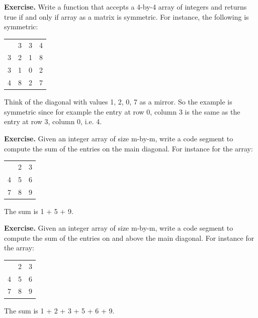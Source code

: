 \textbf{Exercise.} Write a function that accepts a 4-by-4 array of
integers and returns true if and only if array as a matrix is symmetric.
For instance, the following is symmetric:

\begin{longtable}[]{@{}llll@{}}
\toprule\noalign{}
& & & \\
\midrule\noalign{}
\endhead
\bottomrule\noalign{}
\endlastfoot
1 & 3 & 3 & 4 \\
3 & 2 & 1 & 8 \\
3 & 1 & 0 & 2 \\
4 & 8 & 2 & 7 \\
\end{longtable}

Think of the diagonal with values 1, 2, 0, 7 as a mirror. So the example
is symmetric since for example the entry at row 0, column 3 is the same
as the entry at row 3, column 0, i.e. 4.

\textbf{Exercise.} Given an integer array of size m-by-m, write a code
segment to compute the sum of the entries on the main diagonal. For
instance for the array:

\begin{longtable}[]{@{}lll@{}}
\toprule\noalign{}
& & \\
\midrule\noalign{}
\endhead
\bottomrule\noalign{}
\endlastfoot
1 & 2 & 3 \\
4 & 5 & 6 \\
7 & 8 & 9 \\
\end{longtable}

The sum is 1 + 5 + 9.

\textbf{Exercise.} Given an integer array of size m-by-m, write a code
segment to compute the sum of the entries on and above the main
diagonal. For instance for the array:

\begin{longtable}[]{@{}lll@{}}
\toprule\noalign{}
& & \\
\midrule\noalign{}
\endhead
\bottomrule\noalign{}
\endlastfoot
1 & 2 & 3 \\
4 & 5 & 6 \\
7 & 8 & 9 \\
\end{longtable}

The sum is 1 + 2 + 3 + 5 + 6 + 9.


